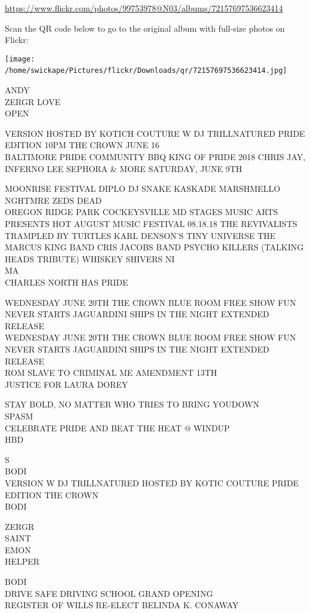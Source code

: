 \documentclass[10pt,letterpaper]{article}
\begin{document}
\url{https://www.flickr.com/photos/99753978@N03/albums/72157697536623414}

Scan the QR code below to go to the original album with full-size photos on Flickr:

\texttt{[image: /home/swickape/Pictures/flickr/Downloads/qr/72157697536623414.jpg]}
\

ANDY\\
ZERGR LOVE\\
OPEN

VERSION HOSTED BY KOTICH COUTURE W DJ TRILLNATURED PRIDE EDITION 10PM THE CROWN JUNE 16\\
BALTIMORE PRIDE COMMUNITY BBQ KING OF PRIDE 2018 CHRIS JAY, INFERNO LEE SEPHORA \& MORE SATURDAY, JUNE 9TH

MOONRISE FESTIVAL DIPLO DJ SNAKE KASKADE MARSHMELLO NGHTMRE ZEDS DEAD\\
OREGON RIDGE PARK COCKEYSVILLE MD STAGES MUSIC ARTS PRESENTS HOT AUGUST MUSIC FESTIVAL 08.18.18 THE REVIVALISTS TRAMPLED BY TURTLES KARL DENSON'S TINY UNIVERSE THE MARCUS KING BAND CRIS JACOBS BAND PSYCHO KILLERS (TALKING HEADS TRIBUTE) WHISKEY SHIVERS NI\\
MA\\
CHARLES NORTH HAS PRIDE

WEDNESDAY JUNE 20TH THE CROWN BLUE ROOM FREE SHOW FUN NEVER STARTS JAGUARDINI SHIPS IN THE NIGHT EXTENDED RELEASE\\
WEDNESDAY JUNE 20TH THE CROWN BLUE ROOM FREE SHOW FUN NEVER STARTS JAGUARDINI SHIPS IN THE NIGHT EXTENDED RELEASE\\
ROM SLAVE TO CRIMINAL ME AMENDMENT 13TH\\
JUSTICE FOR LAURA DOREY

STAY BOLD, NO MATTER WHO TRIES TO BRING YOUDOWN\\
SPASM\\
CELEBRATE PRIDE AND BEAT THE HEAT @ WINDUP\\
HBD

S\\
BODI\\
VERSION W DJ TRILLNATURED HOSTED BY KOTIC COUTURE PRIDE EDITION THE CROWN\\
BODI

ZERGR\\
SAINT\\
EMON\\
HELPER

BODI\\
DRIVE SAFE DRIVING SCHOOL GRAND OPENING\\
REGISTER OF WILLS RE{-}ELECT BELINDA K. CONAWAY
\end{document}
